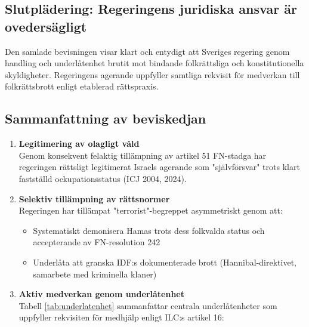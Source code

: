 


\subsection{Slutplädering: Regeringens juridiska ansvar är ovedersägligt}


Den samlade bevisningen visar klart och entydigt att Sveriges regering genom handling och underlåtenhet brutit mot bindande folkrättsliga och konstitutionella skyldigheter. Regeringens agerande uppfyller samtliga rekvisit för medverkan till folkrättsbrott enligt etablerad rättspraxis.

\subsection*{Sammanfattning av beviskedjan}
\begin{enumerate}
    \item \textbf{Legitimering av olagligt våld} \\
    Genom konsekvent felaktig tillämpning av artikel 51 FN-stadga har regeringen rättsligt legitimerat Israels agerande som "självförsvar" trots klart fastställd ockupationsstatus (ICJ 2004, 2024).
    
    \item \textbf{Selektiv tillämpning av rättsnormer} \\
    Regeringen har tillämpat "terrorist"-begreppet asymmetriskt genom att:
    \begin{itemize}
        \item Systematiskt demonisera Hamas trots dess folkvalda status och accepterande av FN-resolution 242
        \item Underlåta att granska IDF:s dokumenterade brott (Hannibal-direktivet, samarbete med kriminella klaner)
    \end{itemize}
    
    \item \textbf{Aktiv medverkan genom underlåtenhet} \\
    Tabell \ref{tab:underlatenhet} sammanfattar centrala underlåtenheter som uppfyller rekvisiten för medhjälp enligt ILC:s artikel 16:
\end{enumerate}

